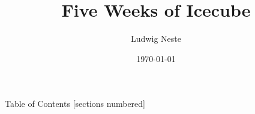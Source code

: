 \documentclass[aspectratio=169]{beamer}
\title{Five Weeks of Icecube}
\date{\today}
\author{Ludwig Neste}
\institute{\colorbox{mDarkTeal}{\texttt{[image: media/su\_logo.pdf]}}}
\begin{document}
\begin{frame}
  \titlepage
\end{frame}

\begin{frame}{Table of Contents}
  [sections numbered]
  \tableofcontents[hideallsubsections]
\end{frame}






\begin{frame}
  \nocite{*}
  \printbibliography
\end{frame}
\end{document}
